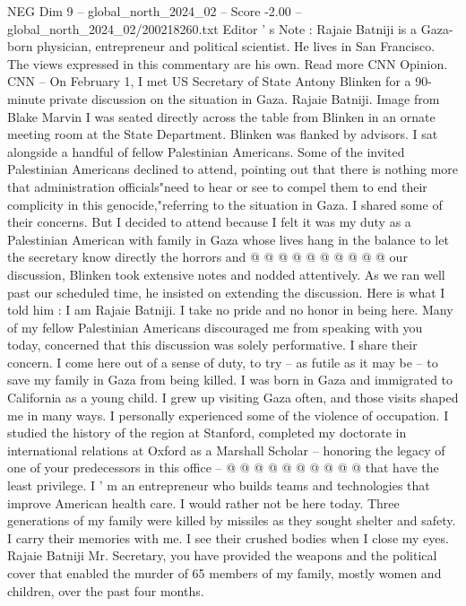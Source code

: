 \begin{textsample}{NEG Dim 9 – global\_north\_2024\_02 – Score -2.00 – global\_north\_2024\_02/200218260.txt}  \label{ex:f9_neg_241}
Editor ' s Note : Rajaie Batniji is a Gaza-born physician, entrepreneur and political scientist.
He lives in San Francisco.
The views expressed in this commentary are his own.
Read more CNN Opinion.
CNN -- On February 1, I met US Secretary of State Antony Blinken for a 90-minute private discussion on the situation in Gaza.
Rajaie Batniji.
Image from Blake Marvin I was seated directly across the table from Blinken in an ornate meeting room at the State Department.
Blinken was flanked by advisors.
I sat alongside a handful of fellow Palestinian Americans.
Some of the invited Palestinian Americans declined to attend, pointing out that there is nothing more that administration officials"need to hear or see to compel them to end their complicity in this genocide,"referring to the situation in Gaza.
I shared some of their concerns.
But I decided to attend because I felt it was my duty as a Palestinian American with family in Gaza whose lives hang in the balance to let the secretary know directly the horrors and @ @ @ @ @ @ @ @ @ @ our discussion, Blinken took extensive notes and nodded attentively.
As we ran well past our scheduled time, he insisted on extending the discussion.
Here is what I told him : I am Rajaie Batniji.
I take no pride and no honor in being here.
Many of my fellow Palestinian Americans discouraged me from speaking with you today, concerned that this discussion was solely performative.
I share their concern.
I come here out of a sense of duty, to try -- as futile as it may be -- to save my family in Gaza from being killed.
I was born in Gaza and immigrated to California as a young child.
I grew up visiting Gaza often, and those visits shaped me in many ways.
I personally experienced some of the violence of occupation.
I studied the history of the region at Stanford, completed my doctorate in international relations at Oxford as a Marshall Scholar -- honoring the legacy of one of your predecessors in this office -- @ @ @ @ @ @ @ @ @ @ that have the least privilege.
I ' m an entrepreneur who builds teams and technologies that improve American health care.
I would rather not be here today.
Three generations of my family were killed by missiles as they sought shelter and safety.
I carry their memories with me.
I see their crushed bodies when I close my eyes.
Rajaie Batniji Mr.
Secretary, you have provided the weapons and the political cover that enabled the murder of 65 members of my family, mostly women and children, over the past four months.

\end{textsample}
